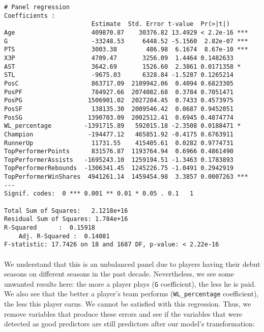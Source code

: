 \begin{verbatim}
# Panel regression
Coefficients :
                     	Estimate  Std. Error t-value  Pr(>|t|)   
Age                     409870.87	 30376.82 13.4929 < 2.2e-16 ***
G                   	-33248.53  	  6448.52 -5.1560  2.82e-07 ***
PTS                   	3003.38  	   486.98  6.1674  8.67e-10 ***
X3P                   	4709.47 	  3256.09  1.4464 0.1482633	
AST                   	3642.69 	  1526.60  2.3861 0.0171358 * 
STL                  	-9675.03 	  6328.84 -1.5287 0.1265214	
PosC                    863717.09  2109942.06  0.4094 0.6823305	
PosPF                   784927.66  2074082.68  0.3784 0.7051471	
PosPG                  1506901.02  2027284.45  0.7433 0.4573975	
PosSF                   138135.30  2009546.42  0.0687 0.9452051	
PosSG                  1390703.09  2002512.41  0.6945 0.4874774	
WL_percentage         -1391715.89   592015.18 -2.3508 0.0188471 * 
Champion               -194477.12   465851.92 -0.4175 0.6763911	
RunnerUp             	11731.55    415405.61  0.0282 0.9774731	
TopPerformerPoints      831576.87  1193764.94  0.6966 0.4861490	
TopPerformerAssists   -1695243.10  1259194.51 -1.3463 0.1783893	
TopPerformerRebounds  -1306341.45  1245226.75 -1.0491 0.2942919	
TopPerformerWinShares  4941261.14  1459454.98  3.3857 0.0007263 ***
---
Signif. codes:  0 *** 0.001 ** 0.01 * 0.05 . 0.1   1
 
Total Sum of Squares:	2.1218e+16
Residual Sum of Squares: 1.784e+16
R-Squared      :  0.15918
 	Adj. R-Squared :  0.14081
F-statistic: 17.7426 on 18 and 1687 DF, p-value: < 2.22e-16
\end{verbatim}

\paragraph{}We understand that this is an unbalanced panel due to players having their debut seasons on different seasons in the past decade. Nevertheless, we see some unwanted results here: the more a player plays (\texttt{G} coefficient), the less he is paid. We also see that the better a player’s team performs (\texttt{WL\_percentage} coefficient), the less this player earns. We cannot be satisfied with this regression. Thus, we remove variables that produce these errors and see if the variables that were detected as good predictors are still predictors after our model's transformation:

